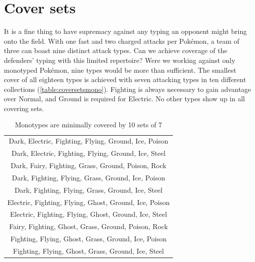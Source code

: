 \section{Cover sets\label{sec:coversets}}
It is a fine thing to have supremacy against any typing an opponent might bring onto the field.
With one fast and two charged attacks per Pokémon, a team of three can boast nine distinct attack types.
Can we achieve coverage of the defenders' typing with this limited repertoire?
Were we working against only monotyped Pokémon, nine types would be more than sufficient.
The smallest cover of all eighteen types is achieved with seven attacking types in
  ten different collections (\autoref{table:coversetsmono}).
Fighting is always necessary to gain advantage over Normal, and Ground is required for Electric.
No other types show up in all covering sets.
\begin{table}
  \centering
  \begin{tabular}{c}
 Dark, Electric, Fighting, Flying, Ground, Ice, Poison\\
 Dark, Electric, Fighting, Flying, Ground, Ice, Steel\\
 Dark, Fairy, Fighting, Grass, Ground, Poison, Rock\\
 Dark, Fighting, Flying, Grass, Ground, Ice, Poison\\
 Dark, Fighting, Flying, Grass, Ground, Ice, Steel\\
 Electric, Fighting, Flying, Ghost, Ground, Ice, Poison\\
 Electric, Fighting, Flying, Ghost, Ground, Ice, Steel\\
 Fairy, Fighting, Ghost, Grass, Ground, Poison, Rock\\
 Fighting, Flying, Ghost, Grass, Ground, Ice, Poison\\
 Fighting, Flying, Ghost, Grass, Ground, Ice, Steel\\
  \end{tabular}
  \caption{Monotypes are minimally covered by 10 sets of 7\label{table:coversetsmono}}
\end{table}

